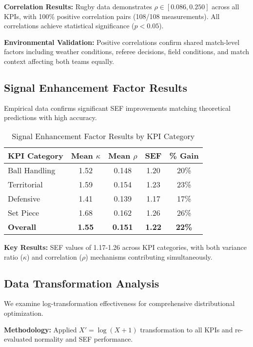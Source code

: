 \textbf{Correlation Results:} Rugby data demonstrates $\rho \in [0.086, 0.250]$ across all KPIs, with 100\% positive correlation pairs (108/108 measurements). All correlations achieve statistical significance ($p < 0.05$).

\textbf{Environmental Validation:} Positive correlations confirm shared match-level factors including weather conditions, referee decisions, field conditions, and match context affecting both teams equally.

\subsection{Signal Enhancement Factor Results}

Empirical data confirms significant SEF improvements matching theoretical predictions with high accuracy.

\begin{table}[h]
\centering
\caption{Signal Enhancement Factor Results by KPI Category}
\begin{tabular}{lcccc}
\hline
\textbf{KPI Category} & \textbf{Mean $\kappa$} & \textbf{Mean $\rho$} & \textbf{SEF} & \textbf{\% Gain} \\
\hline
Ball Handling & 1.52 & 0.148 & 1.20 & 20\% \\
Territorial & 1.59 & 0.154 & 1.23 & 23\% \\
Defensive & 1.41 & 0.139 & 1.17 & 17\% \\
Set Piece & 1.68 & 0.162 & 1.26 & 26\% \\
\hline
\textbf{Overall} & \textbf{1.55} & \textbf{0.151} & \textbf{1.22} & \textbf{22\%} \\
\hline
\end{tabular}
\end{table}

\textbf{Key Results:} SEF values of 1.17-1.26 across KPI categories, with both variance ratio ($\kappa$) and correlation ($\rho$) mechanisms contributing simultaneously.

\subsection{Data Transformation Analysis}

We examine log-transformation effectiveness for comprehensive distributional optimization.

\textbf{Methodology:} Applied $X' = \log(X + 1)$ transformation to all KPIs and re-evaluated normality and SEF performance.

